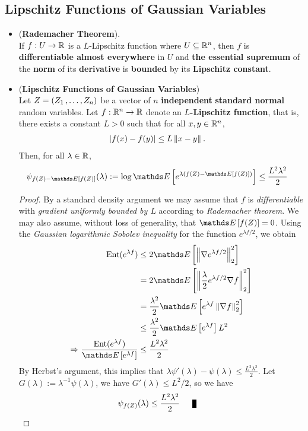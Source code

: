 \documentclass[11pt]{article}
\begin{document}
\subsection{Lipschitz Functions of Gaussian Variables}
\begin{itemize}
\item \begin{theorem} (\textbf{Rademacher Theorem}).\\
If $f: U \to {\mathbb R}$ is a $L$-Lipschitz function where $U \subseteq {\mathbb R}^n$, then $f$ is \textbf{differentiable almost everywhere} in $U$ and \textbf{the essential supremum} of the \textbf{norm} of its \textbf{derivative}  is \textbf{bounded} by its \textbf{Lipschitz constant}. 
\end{theorem}

\item \begin{theorem} (\textbf{Lipschitz Functions of Gaussian Variables}) \citep{boucheron2013concentration} \\
Let $Z = (Z_1 \,{,}\ldots{,}\, Z_n)$ be a vector of $n$ \textbf{independent} \textbf{standard normal} random variables. Let $f : {\mathbb R}^n \to {\mathbb R}$ denote an \textbf{$L$-Lipschitz function}, that is, there exists a constant $L > 0$ such that for all $x, y \in {\mathbb R}^n$,
\begin{align*}
\left\lvert f(x) - f(y) \right\rvert &\le  L\left\|x - y\right\|_{}.
\end{align*} Then, for all $\lambda \in {\mathbb R}$,
\begin{align}
\psi_{f(Z) - \E{}{f(Z)}}(\lambda) := \log \E{}{e^{\lambda\paren{f(Z) - \E{}{f(Z)}}}} &\le \frac{L^2 \lambda^2}{2} \label{ineqn: lip_fun_gaussian}
\end{align}
\end{theorem}
\begin{proof}
By a standard density argument we may assume that $f$ is \emph{differentiable} with \emph{gradient uniformly bounded by $L$} according to \emph{Rademacher theorem}. We may also assume, without loss of generality, that $\E{}{f(Z)} = 0$.  Using the \emph{Gaussian logarithmic Sobolev inequality} for the function $e^{\lambda f/2}$, we obtain
\begin{align*}
\text{Ent}(e^{\lambda f}) &\le 2 \E{}{\norm{\nabla e^{\lambda f/2}}{2}^2} \\
&= 2 \E{}{\norm{\frac{\lambda}{2}e^{\lambda f/2}  \nabla f}{2}^2} \\
&= \frac{\lambda^2}{2} \E{}{e^{\lambda f} \norm{ \nabla f}{2}^2} \\
&\le  \frac{\lambda^2}{2} \E{}{e^{\lambda f}} L^2 \\
\Rightarrow  \frac{\text{Ent}(e^{\lambda f}) }{\E{}{e^{\lambda f}}} &\le \frac{L^2 \lambda^2}{2}
\end{align*} By Herbst's argument, this implies that $\lambda \psi'(\lambda) - \psi(\lambda) \le \frac{L^2 \lambda^2}{2}$. Let $G(\lambda) := \lambda^{-1}\psi(\lambda)$, we have  $G'(\lambda) \le L^2/2$, so we have
\begin{align*}
\psi_{f(Z)}(\lambda) &\le   \frac{L^2 \lambda^2}{2} \qed
\end{align*}
\end{proof}


\end{itemize}
\end{document}
